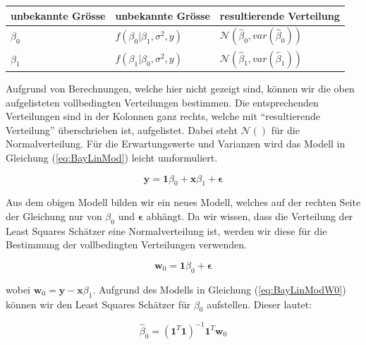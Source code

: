 \documentclass[]{book}
\begin{document}
\vspace{2ex}

\begin{center}
\begin{tabular}{lll}
\hline
unbekannte Grösse  &  unbekannte Grösse                    &  resultierende Verteilung \\
\hline
$\beta_0$          &  $f(\beta_0 | \beta_1, \sigma^2, y)$  &  $\mathcal{N}\left(\hat{\beta}_0, var(\hat{\beta}_0)\right)$ \\
$\beta_1$          &  $f(\beta_1 | \beta_0, \sigma^2, y)$  &  $\mathcal{N}\left(\hat{\beta}_1, var(\hat{\beta}_1)\right)$ \\
\hline
\end{tabular}
\end{center}

Aufgrund von Berechnungen, welche hier nicht gezeigt sind, können wir
die oben aufgelisteten vollbedingten Verteilungen bestimmen. Die
entsprechenden Verteilungen sind in der Kolonnen ganz rechts, welche mit
``resultierende Verteilung'' überschrieben ist, aufgelistet. Dabei steht
\(\mathcal{N}()\) für die Normalverteilung. Für die Erwartungswerte und
Varianzen wird das Modell in Gleichung (\ref{eq:BayLinMod}) leicht
umformuliert.

\begin{equation}
\mathbf{y} = \mathbf{1}\beta_0 + \mathbf{x}\beta_1 + \mathbf{\epsilon}
\label{eq:BayLinModReform}
\end{equation}

Aus dem obigen Modell bilden wir ein neues Modell, welches auf der
rechten Seite der Gleichung nur von \(\beta_0\) und
\(\mathbf{\epsilon}\) abhängt. Da wir wissen, dass die Verteilung der
Least Squares Schätzer eine Normalverteilung ist, werden wir diese für
die Bestimmung der vollbedingten Verteilungen verwenden.

\begin{equation}
\mathbf{w}_0 = \mathbf{1}\beta_0 + \mathbf{\epsilon}
\label{eq:BayLinModW0}
\end{equation}

wobei \(\mathbf{w}_0 = \mathbf{y} - \mathbf{x}\beta_1\). Aufgrund des
Modells in Gleichung (\ref{eq:BayLinModW0}) können wir den Least Squares
Schätzer für \(\beta_0\) aufstellen. Dieser lautet:

\begin{equation}
\hat{\beta}_0 = (\mathbf{1}^T\mathbf{1})^{-1}\mathbf{1}^T\mathbf{w}_0
\label{eq:Beta0LsEst}
\end{equation}
\end{document}
